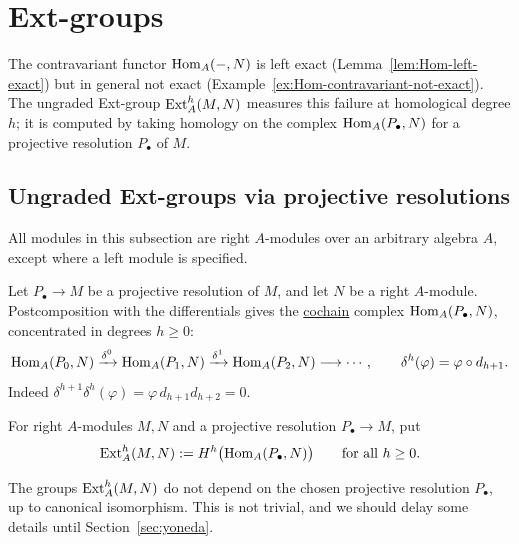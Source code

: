 \clearpage
\section{Ext-groups}\label{sec:ext-tor}

The contravariant functor $\operatorname{Hom}\nolimits_A(-,N)$ is left exact (Lemma~\ref{lem:Hom-left-exact}) but in general not exact (Example~\ref{ex:Hom-contravariant-not-exact}).
The ungraded Ext-group $\operatorname{Ext}\nolimits_A^h(M,N)$ measures this failure at homological degree $h$; it is computed by taking homology on the complex  $\operatorname{Hom}\nolimits_A(P_\bullet,N)$ for a projective resolution $P_\bullet$ of $M$.

\subsection{Ungraded Ext-groups via projective resolutions}

All modules in this subsection are right $A$-modules over an arbitrary algebra $A$, except where a left module is specified.

Let $P_\bullet\to M$ be a projective resolution of $M$, and let $N$ be a right $A$-module.
Postcomposition with the differentials gives the \underline{cochain} complex $\operatorname{Hom}\nolimits_A(P_\bullet,N)$, concentrated in degrees $h\geq0$:
\begin{equation}\label{eq:hom-complex}
\operatorname{Hom}\nolimits_A(P_0,N)\xrightarrow{\delta^0}\operatorname{Hom}\nolimits_A(P_1,N)\xrightarrow{\delta^1}\operatorname{Hom}\nolimits_A(P_2,N)\longrightarrow\cdots,
\qquad\delta^h(\varphi)=\varphi\circ d_{h+1}.
\end{equation}
Indeed $\delta^{h+1}\delta^h(\varphi)=\varphi\, d_{h+1}d_{h+2}=0$.


\begin{definition}\label{def:ext}
For right $A$-modules $M,N$ and a projective resolution $P_\bullet\to M$, put
\[
\operatorname{Ext}\nolimits_A^h(M,N):=H^h\bigl(\operatorname{Hom}\nolimits_A(P_\bullet,N)\bigr)\qquad\text{for all }h\geq0.
\]
\end{definition}

The groups $\operatorname{Ext}\nolimits_A^h(M,N)$ do not depend on the chosen projective resolution $P_\bullet$, up to canonical isomorphism.
This is not trivial, and we should delay some details until Section~\ref{sec:yoneda}.

